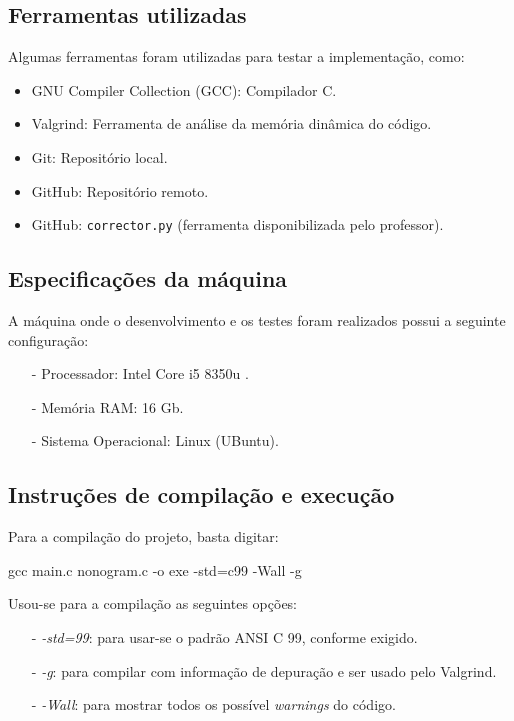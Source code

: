 \documentclass{article}
\begin{document}
\subsection{Ferramentas utilizadas}

Algumas ferramentas foram utilizadas para testar a implementação, como:

\begin{itemize}
    \item GNU Compiler Collection (GCC): Compilador C.
    \item Valgrind: Ferramenta de análise da memória dinâmica do código.
    \item Git: Repositório local.
    \item GitHub: Repositório remoto.
    \item GitHub: \texttt{corrector.py} (ferramenta disponibilizada pelo professor).
\end{itemize}

\subsection{Especificações da máquina}
A máquina onde o desenvolvimento e os testes foram realizados possui a seguinte configuração:
\begin{itemize}
    \item[-] Processador: Intel Core i5 8350u .
    \item[-] Memória RAM: 16 Gb.
    \item[-] Sistema Operacional: Linux (UBuntu).
\end{itemize}

\subsection{Instruções de compilação e execução}

Para a compilação do projeto, basta digitar:

\begin{tcolorbox}[title=Compilando o projeto,width=\linewidth]
    gcc main.c nonogram.c -o exe -std=c99 -Wall -g
\end{tcolorbox}

Usou-se para a compilação as seguintes opções:
\begin{itemize}
    \item [-] \emph{-std=99}: para usar-se o padrão ANSI C 99, conforme exigido.
    \item [-] \emph{-g}: para compilar com informação de depuração e ser usado pelo Valgrind.
    \item [-] \emph{-Wall}: para mostrar todos os possível \emph{warnings} do código.
  
\end{itemize}
\end{document}
